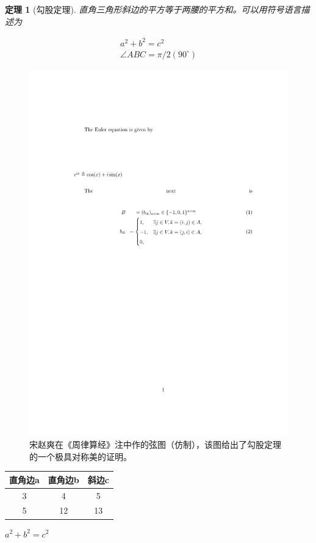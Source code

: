 \documentclass[12pt]{ctexart}
\newtheorem{thm}{定理}
\begin{document}
	\begin{thm}[勾股定理]
		直角三角形斜边的平方等于两腰的平方和。可以用符号语言描述为
	\end{thm}
	\begin{eqnarray}\label{eq:gougu}
		a^2+b^2=c^2\\
		\angle ABC = \pi/2(90^{\circ})
	\end{eqnarray}
	\begin{figure}[ht]
		\centering 
		\includegraphics[width=12cm]{aaa.pdf}
		\caption{宋赵爽在《周律算经》注中作的弦图（仿制），该图给出了勾股定理的一个极具对称美的证明。}
		\label{fig:xiantu}
	\end{figure}

	\begin{table}[h]
		\centering
	\begin{tabular}{|c|c|c|}
		\hline
		直角边a&直角边b&斜边c\\
		\hline
		3&4&5\\
		5&12&13\\
		\hline
	\end{tabular}
	\end{table}

	\qquad $a^2+b^2=c^2$
	\newpage
	\nocite{shiye}
	
\end{document}
